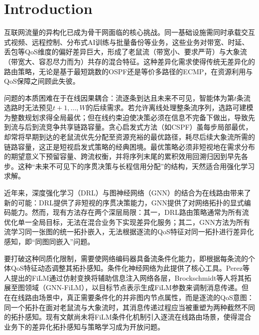 \section{Introduction}
\label{sec:intro}
互联网流量的异构化已成为骨干网面临的核心挑战。同一基础设施需同时承载交互式视频、远程控制、分布式AI训练与批量备份等业务，这些业务对带宽、时延、丢包等QoS维度的偏好差异巨大，形成了老鼠流（带宽小、要求严苛）与大象流（带宽大、容忍尽力而为）共存的混合特征\cite{CISCO2023_GlobalTraffic}。这种差异化需求使得传统无差异化的路由策略，无论是基于最短跳数的OSPF还是等价多路径的ECMP，在资源利用与QoS保障之间顾此失彼。

问题的本质困难在于在线因果耦合：流逐条到达且未来不可见，智能体为第$t$条流选路时无法预见$t+1,\dots,W$的后续需求\cite{Wang1996_QoSRouting}。若允许离线处理整条流序列，选路可建模为整数规划求得全局最优；但在线约束迫使决策必须在信息不完备下做出，导致先到流与后到流竞争共享链路容量。贪心启发式方法（如CSPF）虽每步局部最优，却常将早期到达的老鼠流优先分配至资源充裕的最优路径，耗尽后续大象流所需的链路容量，这正是短视启发式策略的经典困境\cite{Fortz2000_TrafficEngineering}。最优策略必须非短视地在需求分布的期望意义下预留容量、跨流权衡，并将序列末尾的累积效用回溯归因到早先各步。这种``未来不可见下的序贯决策与长程信用分配''的结构，天然适合用强化学习求解。

近年来，深度强化学习（DRL）与图神经网络（GNN）的结合为在线路由带来了新的可能：DRL提供了非短视的序贯决策能力\cite{Sun2022_ScalableRouting_TON,He2024_RoutingOptimization_TMC}，GNN提供了对网络拓扑的显式编码能力\cite{Rusek2020_JSAC_RouteNet,FerriolGalmes_2023_RouteNetFermi,Munikoti2024_DRL_GNN_TNNLS}。然而，现有方法存在两个深层局限：其一，DRL路由策略通常为所有流优化单一全局目标，无法在混合业务下实现差异化服务；其二，GNN方法为所有流学习同一张图的统一拓扑嵌入，无法根据逐流的QoS特征对同一拓扑进行差异化感知，即``同图同嵌入''问题。

要打破这种同质化限制，需要使网络编码器具备流条件化能力，即根据每条流的个体QoS特征动态调整其拓扑感知。条件化神经网络为此提供了核心工具。Perez等人提出的FiLM通过仿射变换将辅助信息注入网络各层\cite{Perez2018_FiLM}，Brockschmidt等人将其拓展至图领域（GNN-FiLM），以目标节点表示生成FiLM参数来调制消息传递\cite{Brockschmidt2020_GNNFiLM}。但在在线路由场景中，真正需要条件化的并非图内节点属性，而是逐流的QoS意图：同一个拓扑在面对老鼠流与大象流时，其消息传递过程应当被重塑为两种截然不同的拓扑感知。现有文献尚未将FiLM条件化机制引入逐流在线路由场景，使得混合业务下的差异化拓扑感知与策略学习成为开放问题。

